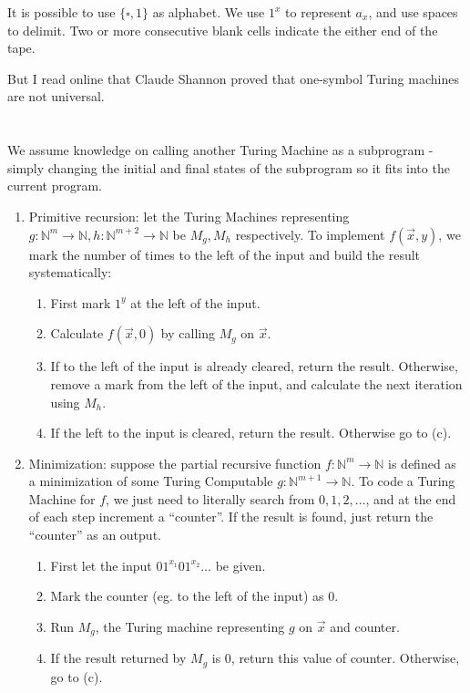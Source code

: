 \documentclass{article}
\theoremstyle{plain}
\newcommand{\N}{\mathbb{N}}
\begin{document}
\medskip It is possible to use $\{\square,1\}$ as alphabet. We use $1^{x}$ to
represent $a_{x}$, and use spaces to delimit. Two or more consecutive blank
cells indicate the either end of the tape.

\medskip But I read online that Claude Shannon proved that one-symbol Turing
machines are not universal.

\section{}
\subsection{}
We assume knowledge on calling another Turing Machine as a subprogram - simply
changing the initial and final states of the subprogram so it fits into the
current program.
\begin{enumerate}[label={\Roman*.}]
  \item {
    Primitive recursion: let the Turing Machines representing
    $g:\N^{m}\to\N, h:\N^{m+2}\to\N$ be $M_{g}, M_{h}$ respectively. To implement
    $f(\overrightarrow{x},y)$, we mark the number of times to the left of the
    input and build the result systematically:
    \begin{enumerate}
      \item First mark $1^{y}$ at the left of the input.
      \item Calculate $f(\overrightarrow{x}, 0)$ by calling $M_{g}$ on
            $\overrightarrow{x}$.
      \item If to the left of the input is already cleared, return the result.
            Otherwise, remove a mark from the left of the input, and calculate
            the next iteration using $M_{h}$.
      \item If the left to the input is cleared, return the result. Otherwise
            go to (c).
    \end{enumerate}
  }
  \item { Minimization: suppose the partial recursive function $f:\N^{m}\to\N$ is
        defined as a minimization of some Turing Computable $g:\N^{m+1}\to\N$. To
        code a Turing Machine for $f$, we just need to literally search from
        ${0,1,2,\ldots}$, and at the end of each step increment a ``counter''. If the
        result is found, just return the ``counter'' as an output.
    \begin{enumerate}
      \item First let the input $01^{x_{1}}01^{x_{2}}\ldots$ be given.
      \item Mark the counter (eg. to the left of the input) as $0$.
      \item Run $M_{g}$, the Turing machine representing $g$ on
            $\overrightarrow{x}$ and counter.
      \item If the result returned by $M_{g}$ is $0$, return this value of
            counter. Otherwise, go to (c).
    \end{enumerate}
  }
\end{enumerate}

\end{document}
